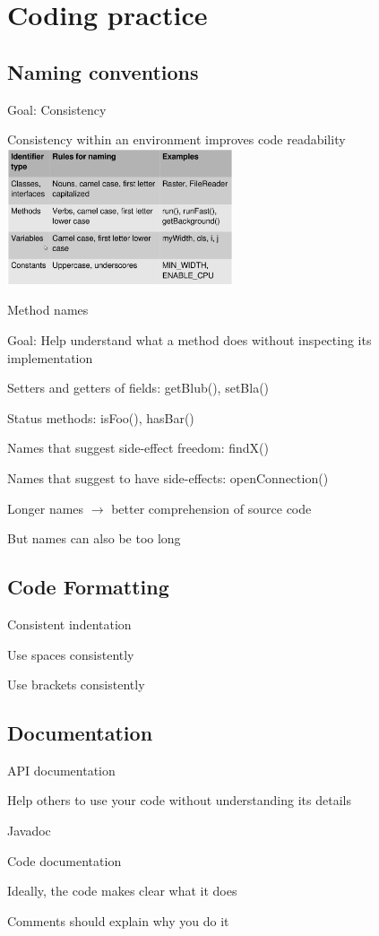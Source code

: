 \section{Coding practice}

\subsection{Naming conventions}
\enumstart
	\item Goal: Consistency
	\item Consistency within an environment improves code readability
	\\ \includegraphics[width=0.5\textwidth]{img/java_naming_conventions.png}
	\item Method names
	\enumstart
		\item Goal: Help understand what a method does without inspecting its implementation
		\item Setters and getters of fields: getBlub(), setBla()
		\item Status methods: isFoo(), hasBar()
		\item Names that suggest side-effect freedom: findX()
		\item Names that suggest to have side-effects: openConnection()
	\enumend
	\item Longer names $\rightarrow$ better comprehension of source code
	\item But names can also be too long
\enumend

\subsection{Code Formatting}
\enumstart
	\item Consistent indentation
	\item Use spaces consistently
	\item Use brackets consistently
\enumend

\subsection{Documentation}
\enumstart
	\item API documentation
	\enumstart
		\item Help others to use your code without understanding its details
		\item Javadoc
	\enumend
	\item Code documentation
	\enumstart
		\item Ideally, the code makes clear what it does
		\item Comments should explain why you do it
	\enumend
\enumend

